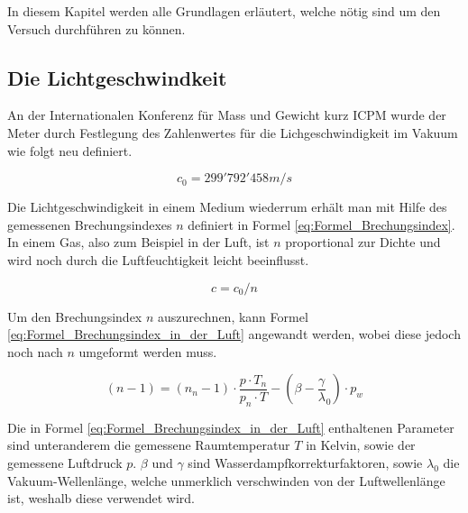 In diesem Kapitel werden alle Grundlagen erläutert, welche nötig sind um den Versuch durchführen zu können. 

\subsection{Die Lichtgeschwindkeit}

An der Internationalen Konferenz für Mass und Gewicht kurz ICPM wurde der Meter durch Festlegung des Zahlenwertes für die Lichgeschwindigkeit im Vakuum wie folgt neu definiert.

\begin{equation*}
c_{0} = 299'792'458 m/s
\label{eq:Lichtgeschwindigkeit}
\end{equation*}

Die Lichtgeschwindigkeit in einem Medium wiederrum erhält man mit Hilfe des gemessenen Brechungsindexes $n$ definiert in Formel \ref{eq:Formel_Brechungsindex}. In einem Gas, also zum Beispiel in der Luft, ist $n$ proportional zur Dichte und wird noch durch die Luftfeuchtigkeit leicht beeinflusst.

\begin{equation}
c=c_{0}/n
\label{eq:Formel_Brechungsindex}
\end{equation}

Um den Brechungsindex $n$ auszurechnen, kann Formel \ref{eq:Formel_Brechungsindex_in_der_Luft} angewandt werden, wobei diese jedoch noch nach $n$ umgeformt werden muss.

\begin{equation}
(n - 1) = (n_{n} - 1)\cdot\dfrac{p \cdot T_{n}}{p_{n} \cdot T}-(\beta - \dfrac{\gamma}{\lambda}_{0}) \cdot p_{w}
\label{eq:Formel_Brechungsindex_in_der_Luft}
\end{equation}

Die in Formel \ref{eq:Formel_Brechungsindex_in_der_Luft} enthaltenen Parameter sind unteranderem die gemessene Raumtemperatur $T$ in Kelvin, sowie der gemessene Luftdruck $p$. $\beta$ und $\gamma$ sind Wasserdampfkorrekturfaktoren, sowie $\lambda_{0}$ die Vakuum-Wellenlänge, welche unmerklich verschwinden von der Luftwellenlänge ist, weshalb diese verwendet wird.

